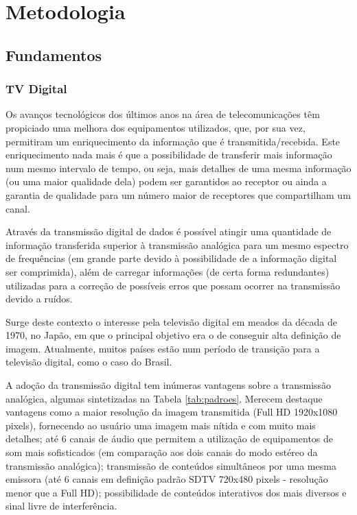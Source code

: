 \chapter{Metodologia}

\section{Fundamentos}

\subsection{TV Digital}

Os avanços tecnológicos dos últimos anos na área de telecomunicações têm propiciado uma melhora dos equipamentos utilizados, que, por sua vez, permitiram um enriquecimento da informação que é transmitida/recebida. Este enriquecimento nada mais é que a possibilidade de transferir mais informação num mesmo intervalo de tempo, ou seja, mais detalhes de uma mesma informação (ou uma maior qualidade dela) podem ser garantidos ao receptor ou ainda a garantia de qualidade para um número maior de receptores que compartilham um canal.

Através da transmissão digital de dados é possível atingir uma quantidade de informação transferida superior à transmissão analógica para um mesmo espectro de frequências (em grande parte devido à possibilidade de a informação digital ser comprimida), além de carregar informações (de certa forma redundantes) utilizadas para a correção de possíveis erros que possam ocorrer na transmissão devido a ruídos.

Surge deste contexto o interesse pela televisão digital em meados da década de 1970, no Japão, em que o principal objetivo era o de conseguir alta definição de imagem. Atualmente, muitos países estão num período de transição para a televisão digital, como o caso do Brasil.

A adoção da transmissão digital tem inúmeras vantagens sobre a transmissão analógica, algumas sintetizadas na Tabela \ref{tab:padroes}. Merecem destaque vantagens como a maior resolução da imagem transmitida (Full HD 1920x1080 pixels), fornecendo ao usuário uma imagem mais nítida e com muito mais detalhes; até 6 canais de áudio que permitem a utilização de equipamentos de som mais sofisticados (em comparação aos dois canais do modo estéreo da transmissão analógica); transmissão de conteúdos simultâneos por uma mesma emissora (até 6 canais em definição padrão SDTV 720x480 pixels - resolução menor que a Full HD); possibilidade de conteúdos interativos dos mais diversos e sinal livre de interferência.

